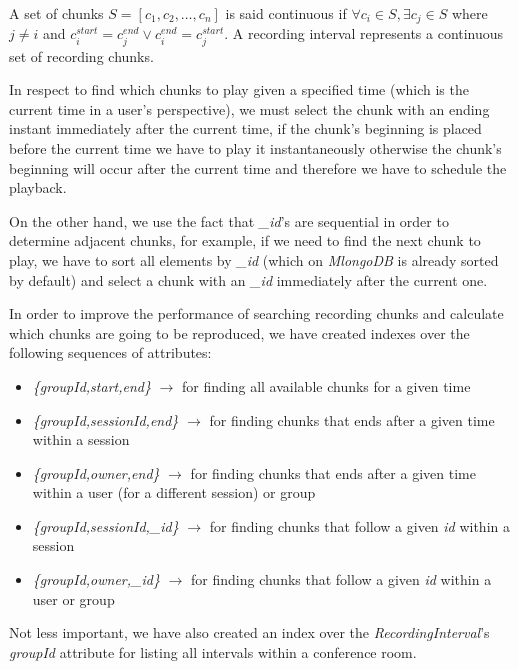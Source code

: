 A set of chunks $S=[c_1,c_2,\ldots,c_n]$ is said continuous if $\forall c_i\in S, \exists c_j \in S$ where $j\neq i$ and $c_i^{start} = c_j^{end} \vee c_i^{end} = c_j^{start}$. 
A recording interval represents a continuous set of recording chunks.

In respect to find which chunks to play given a specified time (which is the current time in a user's perspective), we must select the chunk with an ending instant immediately after the current time, if the chunk's beginning is placed before the current time we have to play it instantaneously otherwise the chunk's beginning will occur after the current time and therefore we have to schedule the playback.

On the other hand, we use the fact that \emph{\_id}'s are sequential in order to determine adjacent chunks, for example, if we need to find the next chunk to play, we have to sort all elements by \emph{\_id} (which on \emph{MlongoDB} is already sorted by default) and select a chunk with an \emph{\_id} immediately after the current one. 

In order to improve the performance of searching recording chunks and calculate which chunks are going to be reproduced, we have created indexes over the following sequences of attributes: 
\begin{itemize}
    \item{\emph{\{groupId,start,end\}} $\rightarrow$ for finding all available chunks for a given time} 
    \item{\emph{\{groupId,sessionId,end\}} $\rightarrow$ for finding chunks that ends after a given time within a session}
    \item{\emph{\{groupId,owner,end\}} $\rightarrow$ for finding chunks that ends after a given time within a user (for a different session) or group}
    \item{\emph{\{groupId,sessionId,\_id\}} $\rightarrow$ for finding chunks that follow a given \emph{id} within a session}
    \item{\emph{\{groupId,owner,\_id\}} $\rightarrow$ for finding chunks that follow a given \emph{id} within a user or group}
\end{itemize}



Not less important, we have also created an index over the \emph{RecordingInterval}'s \emph{groupId} attribute for listing all intervals within a conference room. 



